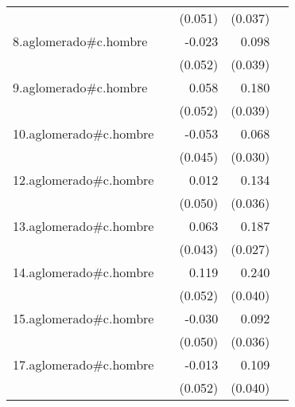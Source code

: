 {\begin{longtable}{l*{4}{D{.}{.}{-1}}}
            &                     &     (0.051)         &     (0.037)         &                     \\
\addlinespace
8.aglomerado#c.hombre&                     &      -0.023         &       0.098\sym{*}  &                     \\
            &                     &     (0.052)         &     (0.039)         &                     \\
\addlinespace
9.aglomerado#c.hombre&                     &       0.058         &       0.180\sym{***}&                     \\
            &                     &     (0.052)         &     (0.039)         &                     \\
\addlinespace
10.aglomerado#c.hombre&                     &      -0.053         &       0.068\sym{*}  &                     \\
            &                     &     (0.045)         &     (0.030)         &                     \\
\addlinespace
12.aglomerado#c.hombre&                     &       0.012         &       0.134\sym{***}&                     \\
            &                     &     (0.050)         &     (0.036)         &                     \\
\addlinespace
13.aglomerado#c.hombre&                     &       0.063         &       0.187\sym{***}&                     \\
            &                     &     (0.043)         &     (0.027)         &                     \\
\addlinespace
14.aglomerado#c.hombre&                     &       0.119\sym{*}  &       0.240\sym{***}&                     \\
            &                     &     (0.052)         &     (0.040)         &                     \\
\addlinespace
15.aglomerado#c.hombre&                     &      -0.030         &       0.092\sym{*}  &                     \\
            &                     &     (0.050)         &     (0.036)         &                     \\
\addlinespace
17.aglomerado#c.hombre&                     &      -0.013         &       0.109\sym{**} &                     \\
            &                     &     (0.052)         &     (0.040)         &                     \\

\end{longtable}}
